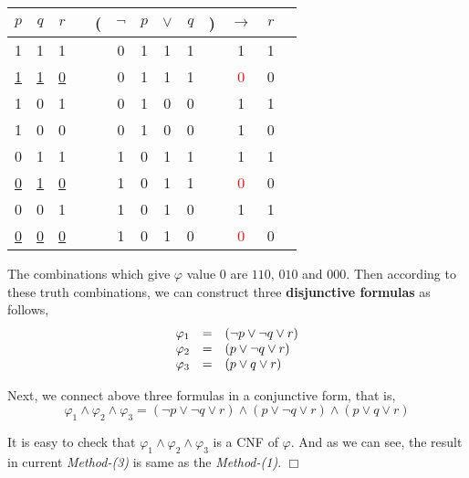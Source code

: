 \documentclass[UTF8,12pt,a4paper]{ctexart}
\begin{document}
\begin{center}
	\begin{tabular}{@{ }c@{ }@{ }c@{ }@{ }c | c@{ }@{}c@{}@{ }c@{ }@{ }c@{ }@{ }c@{ }@{ }c@{ }@{}c@{}@{ }c@{ }@{ }c@{ }@{ }c}
		$p$ & $q$ & $r$ &  & ( & $\lnot$ & $p$ & $\lor$ & $q$ & ) & $\rightarrow$ & $r$ & \\
		\hline 
		1 & 1 & 1 &  &  & 0 & 1 & 1 & 1 &  &                  1 & 1 & \\
		\underline{1} & \underline{1} & \underline{0} &  &  & 0 & 1 & 1 & 1 &  & \textcolor{red}{0} & 0 & \\
		1 & 0 & 1 &  &  & 0 & 1 & 0 & 0 &  &                 1  & 1 & \\
		1 & 0 & 0 &  &  & 0 & 1 & 0 & 0 &  & 				 1 & 0 & \\
		0 & 1 & 1 &  &  & 1 & 0 & 1 & 1 &  & 				 1 & 1 & \\
		\underline{0} & \underline{1} & \underline{0} &  &  & 1 & 0 & 1 & 1 &  & \textcolor{red}{0} & 0 & \\
		0 & 0 & 1 &  &  & 1 & 0 & 1 & 0 &  & 				 1 & 1 & \\
		\underline{0} & \underline{0} & \underline{0} &  &  & 1 & 0 & 1 & 0 &  & \textcolor{red}{0} & 0 & \\
	\end{tabular}
\end{center}

The combinations which give $\varphi$ value $0$ are $110$, $010$ and $000$. 
Then according to these truth combinations, we can construct three \textbf{disjunctive formulas} as follows,
\[\begin{array}{l l l}
	\varphi_1 
	&=&
	(\neg p \lor \neg q \lor r) \\ 
	
	\varphi_2
	&=&
	( p \lor \neg q \lor r) \\
	
	\varphi_3
	&=&
	( p \lor  q \lor r)  \\
\end{array}\]

Next, we connect above three formulas in a conjunctive form, that is,
\[
\varphi_1 \land \varphi_2 \land \varphi_3 = ( \neg p \lor \neg q \lor  r) \land  ( p \lor \neg q \lor r) \land  ( p \lor  q \lor r)
\]

It is easy to check that  $\varphi_1 \land \varphi_2 \land \varphi_3$ is a CNF of $\varphi$. 
And as we can see, the result in current \textit{Method-(3)} is same as the  \textit{Method-(1)}. 
\hfill $\Box$
\end{document}
